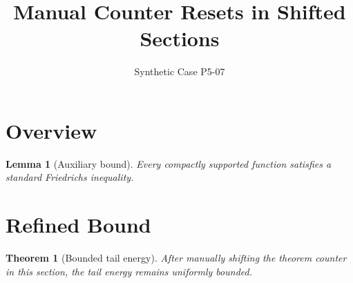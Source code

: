 \documentclass{article}
\title{Manual Counter Resets in Shifted Sections}
\author{Synthetic Case P5-07}
\newtheorem{thm}{Theorem}[section]
\newtheorem{lem}{Lemma}[section]
\begin{document}
\maketitle

\section{Overview}
\label{sec:overview}

\begin{lem}[Auxiliary bound]
\label{lem:aux}
Every compactly supported function satisfies a standard Friedrichs inequality.
\end{lem}

\section{Refined Bound}
\label{sec:refined}

\setcounter{thm}{3}
\begin{thm}[Bounded tail energy]
\label{thm:drifted-bound}
After manually shifting the theorem counter in this section, the tail energy remains uniformly bounded.
\end{thm}
\end{document}
